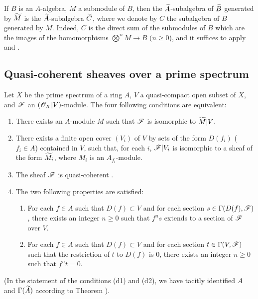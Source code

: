 \begin{env}[1.3.14]
\label{1.1.3.14}
If $B$ is an $A$-algebra, $M$ a submodule of $B$, then the $\widetilde{A}$-subalgebra of
$\widetilde{B}$ generated by $\widetilde{M}$  is the
$\widetilde{A}$-subalgebra $\widetilde{C}$, where we denote by $C$ the subalgebra of $B$
generated by $M$. Indeed, $C$ is the direct sum of the submodules of $B$ which are the images
of the homomorphisms $\bigotimes^n M\to B$ ($n\geqslant 0$), and it suffices to apply
 and .
\end{env}

\subsection{Quasi-coherent sheaves over a prime spectrum}
\label{subsection-qcoh-sheaves-over-spec}

\begin{thm}[1.4.1]
\label{1.1.4.1}
Let $X$ be the prime spectrum of a ring $A$, $V$ a quasi-compact open subset of $X$, and
$\mathscr{F}$ an $(\mathscr{O}_X|V)$-module. The four following conditions are equivalent:
\begin{enumerate}[label=\emph{(\alph*)}]
  \item There exists an $A$-module $M$ such that $\mathscr{F}$ is isomorphic to $\widetilde{M}|V$.
  \item There exists a finite open cover $(V_i)$ of $V$ by sets of the form $D(f_i)$
    ($f_i\in A$) contained in $V$, such that, for each $i$, $\mathscr{F}|V_i$ is isomorphic to
    a sheaf of the form $\widetilde{M_i}$, where $M_i$ is an $A_{f_i}$-module.
  \item The sheaf $\mathscr{F}$ is quasi-coherent .
  \item The two following properties are satisfied:
    \begin{enumerate}[label=\emph{(d\arabic*)}]
      \item For each $f\in A$ such that $D(f)\subset V$ and for each section
        $s\in\Gamma(D(f),\mathscr{F})$, there exists an integer $n\geqslant 0$ such that
        $f^n s$ extends to a section of $\mathscr{F}$ over $V$.
      \item For each $f\in A$ such that $D(f)\subset V$ and for each section
        $t\in\Gamma(V,\mathscr{F})$ such that the restriction of $t$ to $D(f)$ is $0$,
        there exists an integer $n\geqslant 0$ such that $f^n t=0$.
    \end{enumerate}
\end{enumerate}
\end{thm}
(In the statement of the conditions (d1) and (d2), we have tacitly identified $A$ and
$\Gamma(\widetilde{A})$ according to Theorem ).

